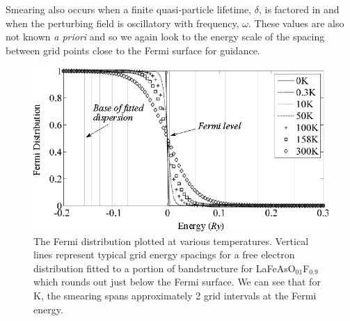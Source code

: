 Smearing also occurs when a finite quasi-particle lifetime, $\delta$, is factored in and when the perturbing field is oscillatory with frequency, $\omega$. These values are also not known \textit{a priori} and so we again look to the energy scale of the spacing between grid points close to the Fermi surface for guidance.

\begin{figure}[htbp]
    \begin{center}
        \includegraphics[scale=0.9]{Chapter-dHvABaFe2P2/Figures/AngleDepMeasurements/SusceptibilityTempSmearing/SusceptibilityTempSmearing}
        \caption{The Fermi distribution plotted at various temperatures. Vertical lines represent typical grid energy spacings for a free electron distribution fitted to a portion of bandstructure for LaFeAsO$_{01}$F$_{0.9}$ which rounds out just below the Fermi surface. We can see that for \unit[158]{K}, the smearing spans approximately 2 grid intervals at the Fermi energy.}
        \label{Fig:Exp:SusceptibilityTempSmearing}
    \end{center}
\end{figure}

